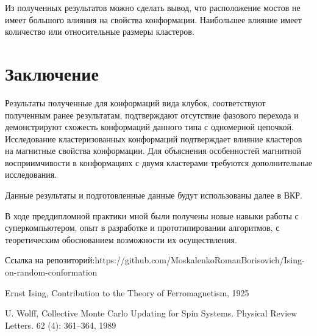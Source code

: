 \documentclass[14pt]{extarticle}
\begin{document}
Из полученных результатов можно сделать вывод, что расположение мостов не имеет большого влияния на свойства конформации. Наибольшее влияние имеет количество или относительные размеры кластеров.


\section{Заключение}
Результаты полученные для конформаций вида клубок, соответствуют полученным ранее результатам, подтверждают отсутствие фазового перехода и демонстрируют схожесть конформаций данного типа с одномерной цепочкой. Исследование кластеризованных конформаций подтверждает влияние кластеров на магнитные свойства конформации. Для объяснения особенностей магнитной восприимчивости в конформациях с двумя кластерами требуются дополнительные исследования. 

Данные результаты и подготовленные данные будут использованы далее в ВКР.

В ходе преддипломной практики мной были получены новые навыки работы с суперкомпьютером, опыт в разработке и прототипировании алгоритмов, с теоретическим обоснованием возможности их осуществления.

\begin{thebibliography}{9}
 Ссылка на репозиторий:https://github.com/MoskalenkoRomanBorisovich/Ising-on-random-conformation 
 
Ernst Ising, Contribution to the Theory of Ferromagnetism, 1925


 U. Wolff, Collective Monte Carlo Updating for Spin Systems. Physical Review Letters. 62 (4): 361–364, 1989
 
\end{thebibliography}
\end{document}
